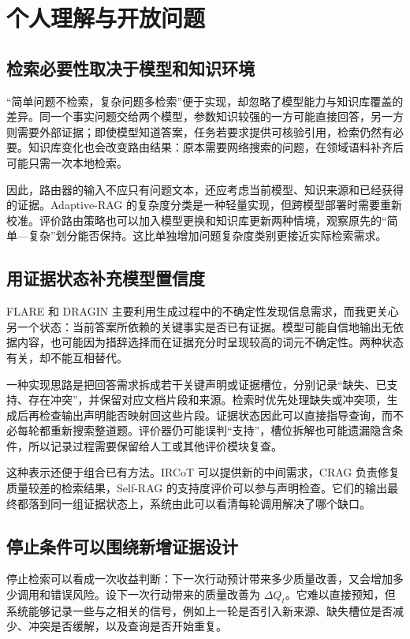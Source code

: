 \section{个人理解与开放问题}
\label{sec:discussion}

\subsection{检索必要性取决于模型和知识环境}

“简单问题不检索，复杂问题多检索”便于实现，却忽略了模型能力与知识库覆盖的差异。同一个事实问题交给两个模型，参数知识较强的一方可能直接回答，另一方则需要外部证据；即使模型知道答案，任务若要求提供可核验引用，检索仍然有必要。知识库变化也会改变路由结果：原本需要网络搜索的问题，在领域语料补齐后可能只需一次本地检索。

因此，路由器的输入不应只有问题文本，还应考虑当前模型、知识来源和已经获得的证据。Adaptive-RAG 的复杂度分类是一种轻量实现，但跨模型部署时需要重新校准。评价路由策略也可以加入模型更换和知识库更新两种情境，观察原先的“简单—复杂”划分能否保持。这比单独增加问题复杂度类别更接近实际检索需求。

\subsection{用证据状态补充模型置信度}

FLARE 和 DRAGIN 主要利用生成过程中的不确定性发现信息需求，而我更关心另一个状态：当前答案所依赖的关键事实是否已有证据。模型可能自信地输出无依据内容，也可能因为措辞选择而在证据充分时呈现较高的词元不确定性。两种状态有关，却不能互相替代。

一种实现思路是把回答需求拆成若干关键声明或证据槽位，分别记录“缺失、已支持、存在冲突”，并保留对应文档片段和来源。检索时优先处理缺失或冲突项，生成后再检查输出声明能否映射回这些片段。证据状态因此可以直接指导查询，而不必每轮都重新搜索整道题。评价器仍可能误判“支持”，槽位拆解也可能遗漏隐含条件，所以记录过程需要保留给人工或其他评价模块复查。

这种表示还便于组合已有方法。IRCoT 可以提供新的中间需求，CRAG 负责修复质量较差的检索结果，Self-RAG 的支持度评价可以参与声明检查。它们的输出最终都落到同一组证据状态上，系统由此可以看清每轮调用解决了哪个缺口。

\subsection{停止条件可以围绕新增证据设计}

停止检索可以看成一次收益判断：下一次行动预计带来多少质量改善，又会增加多少调用和错误风险。设下一次行动带来的质量改善为 $\Delta Q_t$。它难以直接预知，但系统能够记录一些与之相关的信号，例如上一轮是否引入新来源、缺失槽位是否减少、冲突是否缓解，以及查询是否开始重复。

